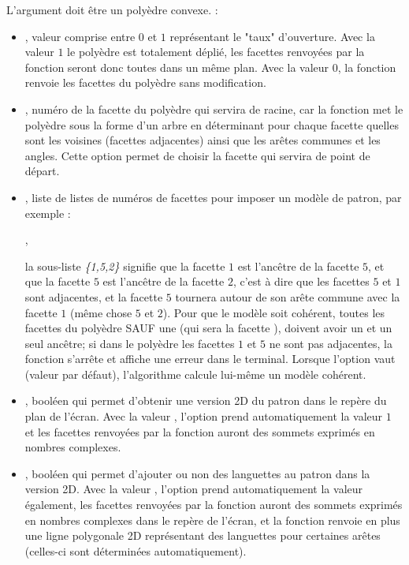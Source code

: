 L'argument  doit être un polyèdre convexe. \writeoptions :
\begin{itemize}
    \item {}, valeur comprise entre $0$ et $1$ représentant le "taux" d'ouverture. Avec la valeur $1$ le polyèdre est totalement déplié, les facettes renvoyées par la fonction seront donc toutes dans un même plan. Avec la valeur $0$, la fonction renvoie les facettes du polyèdre sans modification.
    
    \item {}, numéro de la facette du polyèdre qui servira de racine, car la fonction met le polyèdre sous la forme d'un arbre en déterminant pour chaque facette quelles sont les voisines (facettes adjacentes) ainsi que les arêtes communes et les angles.
    Cette option permet de choisir la facette qui servira de point de départ.
    
    \item {}, liste de listes de numéros de facettes pour imposer un modèle de patron, par exemple :\par \hfil{},\hfil\par la sous-liste  \emph{\{1,5,2\}} signifie que la facette $1$ est l'ancêtre de la facette $5$, et que la facette $5$ est l'ancêtre de la facette $2$, c'est à dire que les facettes $5$ et $1$  sont adjacentes, et la facette $5$ tournera autour de son arête commune avec la facette $1$ (même chose $5$ et $2$). Pour que le modèle soit cohérent, toutes les facettes du polyèdre SAUF une (qui sera la facette ), doivent avoir un et un seul ancêtre; si dans le polyèdre les facettes $1$ et $5$ ne sont pas adjacentes, la fonction s'arrête et affiche une erreur dans le terminal. Lorsque l'option  vaut \nil (valeur par défaut), l'algorithme calcule lui-même un modèle cohérent.
    
    \item {}, booléen qui permet d'obtenir une version 2D du patron dans le repère du plan de l'écran. Avec la valeur \true, l'option  prend automatiquement la valeur $1$ et les facettes renvoyées par la fonction auront des sommets exprimés en nombres complexes.
    
    \item {}, booléen qui permet d'ajouter ou non des languettes au patron dans la version 2D.  Avec la valeur \true, l'option  prend automatiquement la valeur \true également, les facettes renvoyées par la fonction auront des sommets exprimés en nombres complexes dans le repère de l'écran, et la fonction renvoie en plus une ligne polygonale 2D représentant des languettes pour certaines arêtes (celles-ci sont déterminées automatiquement).
    

\end{itemize}
